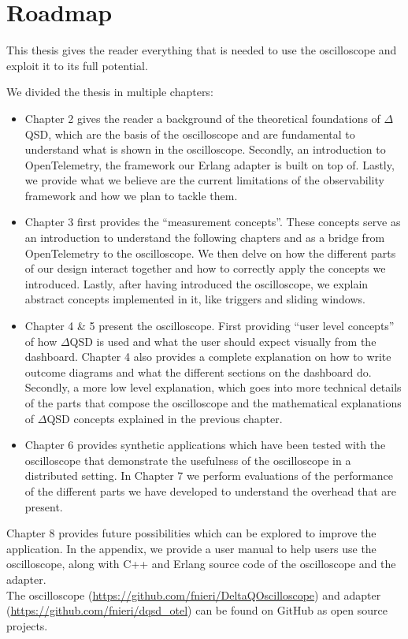 \section{Roadmap}
    This thesis gives the reader everything that is needed to use the oscilloscope and exploit it to its full potential.

    We divided the thesis in multiple chapters:
    \begin{itemize}
        \item Chapter 2 gives the reader a background of the theoretical foundations of $\Delta$QSD, which are the basis of the oscilloscope and are fundamental to understand what is shown in the oscilloscope. Secondly, an introduction to OpenTelemetry, the framework our Erlang adapter is built on top of. Lastly, we provide what we believe are the current limitations of the observability framework and how we plan to tackle them.
        \item Chapter 3 first provides the ``measurement concepts''. These concepts serve as an introduction to understand the following chapters and as a bridge from OpenTelemetry to the oscilloscope.  We then delve on how the different parts of our design interact together and how to correctly apply the concepts we introduced. Lastly, after having introduced the oscilloscope, we explain abstract concepts implemented in it, like triggers and sliding windows.
        \item Chapter 4 \& 5 present the oscilloscope. First providing ``user level concepts'' of how $\Delta$QSD is used and what the user should expect visually from the dashboard. Chapter 4 also provides a complete explanation on how to write outcome diagrams and what the different sections on the dashboard do.
            Secondly, a more low level explanation, which goes into more technical details of the parts that compose the oscilloscope and the mathematical explanations of $\Delta$QSD concepts explained in the previous chapter.
        \item Chapter 6 provides synthetic applications which have been tested with the oscilloscope that demonstrate the usefulness of the oscilloscope in a distributed setting. In Chapter 7 we perform evaluations of the performance of the different parts we have developed to understand the overhead that are present.
    \end{itemize}

    Chapter 8 provides future possibilities which can be explored to improve the application. In the appendix, we provide a user manual to help users use the oscilloscope, along with C++ and Erlang source code of the oscilloscope and the adapter. \\
   \sloppy The oscilloscope (\url{https://github.com/fnieri/DeltaQOscilloscope}) and adapter (\url{https://github.com/fnieri/dqsd_otel}) can be found on GitHub as open source projects.
